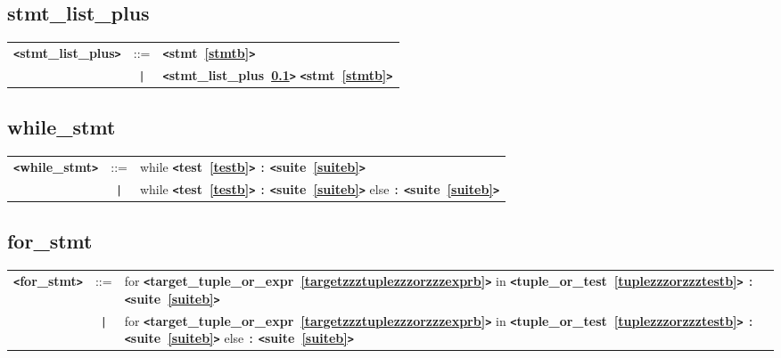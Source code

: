 \documentclass[12pt]{article}
\begin{document}
\subsection{stmt\_list\_plus}
\label{stmtzzzlistzzzplusb}
\begin{tabular}{lcl}
{\bf \verb+<+stmt\_list\_plus\verb+>+} & ::=  & {\bf \verb+<+stmt~\ref{stmtb}\verb+>+}  \\
 & \verb+|+  & {\bf \verb+<+stmt\_list\_plus~\ref{stmtzzzlistzzzplusb}\verb+>+}  {\bf \verb+<+stmt~\ref{stmtb}\verb+>+}  \\
\end{tabular}

\subsection{while\_stmt}
\label{whilezzzstmtb}
\newlength{\tw}
\settowidth{\tw}{while\_stmt  ::=  }
\addtolength{\tw}{2\arraycolsep}
\newlength{\len}
\setlength{\len}{\textwidth}
\addtolength{\len}{-1\tw}
\begin{tabular}{lcp{\len}}
{\bf \verb+<+while\_stmt\verb+>+} & ::=  & while {\bf \verb+<+test~\ref{testb}\verb+>+}  \verb|:| {\bf \verb+<+suite~\ref{suiteb}\verb+>+}  \\
 & \verb+|+  & while {\bf \verb+<+test~\ref{testb}\verb+>+}  \verb|:| {\bf \verb+<+suite~\ref{suiteb}\verb+>+}  else \verb|:| {\bf \verb+<+suite~\ref{suiteb}\verb+>+}  \\
\end{tabular}

\subsection{for\_stmt}
\label{forzzzstmtb}
\newlength{\tw}
\settowidth{\tw}{for\_stmt  ::=  }
\addtolength{\tw}{2\arraycolsep}
\newlength{\len}
\setlength{\len}{\textwidth}
\addtolength{\len}{-1\tw}
\begin{tabular}{lcp{\len}}
{\bf \verb+<+for\_stmt\verb+>+} & ::=  & for {\bf \verb+<+target\_tuple\_or\_expr~\ref{targetzzztuplezzzorzzzexprb}\verb+>+}  in {\bf \verb+<+tuple\_or\_test~\ref{tuplezzzorzzztestb}\verb+>+}  \verb|:| {\bf \verb+<+suite~\ref{suiteb}\verb+>+}  \\
 & \verb+|+  & for {\bf \verb+<+target\_tuple\_or\_expr~\ref{targetzzztuplezzzorzzzexprb}\verb+>+}  in {\bf \verb+<+tuple\_or\_test~\ref{tuplezzzorzzztestb}\verb+>+}  \verb|:| {\bf \verb+<+suite~\ref{suiteb}\verb+>+}  else \verb|:| {\bf \verb+<+suite~\ref{suiteb}\verb+>+}  \\
\end{tabular}
\end{document}

